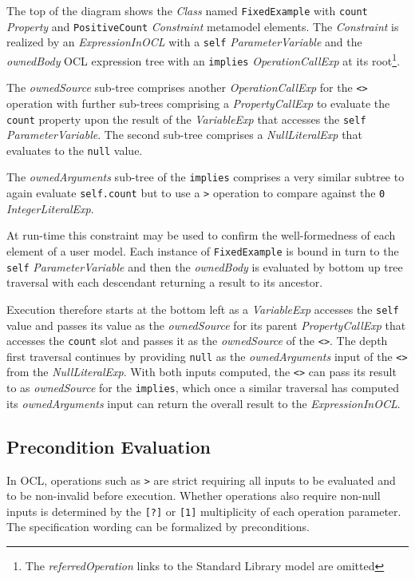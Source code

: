 \documentclass[
]{ceurart}
\begin{document}
The top of the diagram shows the \emph{Class} named \verb|FixedExample| with \verb|count| \emph{Property} and \verb|PositiveCount| \emph{Constraint} metamodel elements. The \emph{Constraint} is realized by an \emph{ExpressionInOCL} with a \verb|self| \emph{ParameterVariable} and the \emph{ownedBody} OCL expression tree with an \verb|implies| \emph{OperationCallExp} at its root\footnote{The \emph{referredOperation} links to the Standard Library model are omitted}.

The \emph{ownedSource} sub-tree comprises another \emph{OperationCallExp} for the \verb|<>| operation with further sub-trees comprising a \emph{PropertyCallExp} to evaluate the \verb|count| property upon the result of the \emph{VariableExp} that accesses the \verb|self| \emph{ParameterVariable}. The second sub-tree comprises a \emph{NullLiteralExp} that evaluates to the \verb|null| value.

The \emph{ownedArguments} sub-tree of the \verb|implies| comprises a very similar subtree to again evaluate \verb|self.count| but to use a \verb|>| operation to compare against the \verb|0| \emph{IntegerLiteralExp}.

At run-time this constraint may be used to confirm the well-formedness of each element of a user model. Each instance of \verb|FixedExample| is bound in turn to the \verb|self| \emph{ParameterVariable} and then the \emph{ownedBody} is evaluated by bottom up tree traversal with each descendant returning a result to its ancestor.

Execution therefore starts at the bottom left as a \emph{VariableExp} accesses the \verb|self| value and passes its value as the \emph{ownedSource} for its parent \emph{PropertyCallExp} that accesses the \verb|count| slot and passes it as the \emph{ownedSource} of the \verb|<>|. The depth first traversal continues by providing \verb|null| as the \emph{ownedArguments} input of the \verb|<>| from the \emph{NullLiteralExp}. With both inputs computed, the \verb|<>| can pass its result to as  \emph{ownedSource} for the \verb|implies|, which once a similar traversal has computed its \emph{ownedArguments} input can return the overall result to the \emph{ExpressionInOCL}.

\subsection{Precondition Evaluation}\label{Precondition Evaluation}

In OCL, operations such as \verb|>| are strict requiring all inputs to be evaluated and to be non-invalid before execution. Whether operations also require non-null inputs is determined by the \verb|[?]| or \verb|[1]| multiplicity of each operation parameter. The specification wording can be formalized by preconditions.
\end{document}
